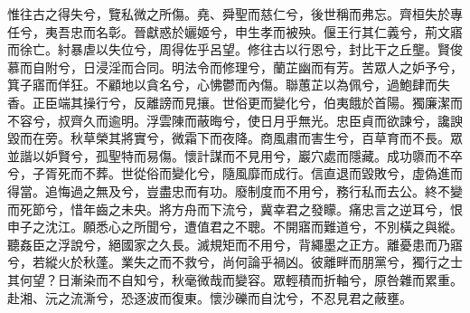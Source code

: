 
\begin{pinyinscope}
惟往古之得失兮，覽私微之所傷。堯、舜聖而慈仁兮，後世稱而弗忘。齊桓失於專任兮，夷吾忠而名彰。晉獻惑於孋姬兮，申生孝而被殃。偃王行其仁義兮，荊文寤而徐亡。紂暴虐以失位兮，周得佐乎呂望。修往古以行恩兮，封比干之丘壟。賢俊慕而自附兮，日浸淫而合同。明法令而修理兮，蘭芷幽而有芳。苦眾人之妒予兮，箕子寤而佯狂。不顧地以貪名兮，心怫鬱而內傷。聯蕙芷以為佩兮，過鮑肆而失香。正臣端其操行兮，反離謗而見攘。世俗更而變化兮，伯夷餓於首陽。獨廉潔而不容兮，叔齊久而逾明。浮雲陳而蔽晦兮，使日月乎無光。忠臣貞而欲諫兮，讒諛毀而在旁。秋草榮其將實兮，微霜下而夜降。商風肅而害生兮，百草育而不長。眾並諧以妒賢兮，孤聖特而易傷。懷計謀而不見用兮，巖穴處而隱藏。成功隳而不卒兮，子胥死而不葬。世從俗而變化兮，隨風靡而成行。信直退而毀敗兮，虛偽進而得當。追悔過之無及兮，豈盡忠而有功。廢制度而不用兮，務行私而去公。終不變而死節兮，惜年齒之未央。將方舟而下流兮，冀幸君之發矇。痛忠言之逆耳兮，恨申子之沈江。願悉心之所聞兮，遭值君之不聰。不開寤而難道兮，不別橫之與縱。聽姦臣之浮說兮，絕國家之久長。滅規矩而不用兮，背繩墨之正方。離憂患而乃寤兮，若縱火於秋蓬。業失之而不救兮，尚何論乎禍凶。彼離畔而朋黨兮，獨行之士其何望？日漸染而不自知兮，秋毫微哉而變容。眾輕積而折軸兮，原咎雜而累重。赴湘、沅之流澌兮，恐逐波而復東。懷沙礫而自沈兮，不忍見君之蔽壅。


\end{pinyinscope}